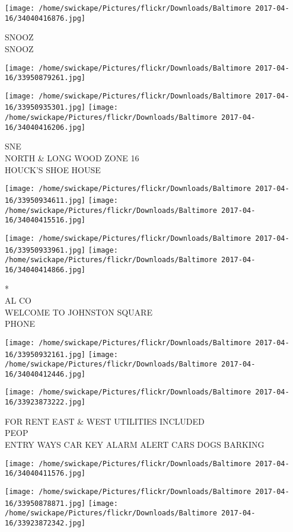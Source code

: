 \documentclass[10pt,letterpaper]{article}
\begin{document}
\vspace{0.25in}
\texttt{[image: /home/swickape/Pictures/flickr/Downloads/Baltimore 2017-04-16/34040416876.jpg]}

SNOOZ\\
SNOOZ
\pagebreak

\texttt{[image: /home/swickape/Pictures/flickr/Downloads/Baltimore 2017-04-16/33950879261.jpg]}

\vspace{0.25in}
\texttt{[image: /home/swickape/Pictures/flickr/Downloads/Baltimore 2017-04-16/33950935301.jpg]}
\texttt{[image: /home/swickape/Pictures/flickr/Downloads/Baltimore 2017-04-16/34040416206.jpg]}

SNE\\
NORTH \& LONG WOOD ZONE 16\\
HOUCK'S SHOE HOUSE
\pagebreak

\texttt{[image: /home/swickape/Pictures/flickr/Downloads/Baltimore 2017-04-16/33950934611.jpg]}
\texttt{[image: /home/swickape/Pictures/flickr/Downloads/Baltimore 2017-04-16/34040415516.jpg]}

\texttt{[image: /home/swickape/Pictures/flickr/Downloads/Baltimore 2017-04-16/33950933961.jpg]}
\texttt{[image: /home/swickape/Pictures/flickr/Downloads/Baltimore 2017-04-16/34040414866.jpg]}

*\\
AL CO\\
WELCOME TO JOHNSTON SQUARE\\
PHONE
\pagebreak

\texttt{[image: /home/swickape/Pictures/flickr/Downloads/Baltimore 2017-04-16/33950932161.jpg]}
\texttt{[image: /home/swickape/Pictures/flickr/Downloads/Baltimore 2017-04-16/34040412446.jpg]}

\texttt{[image: /home/swickape/Pictures/flickr/Downloads/Baltimore 2017-04-16/33923873222.jpg]}

FOR RENT EAST \& WEST UTILITIES INCLUDED\\
PEOP\\
ENTRY WAYS CAR KEY ALARM ALERT CARS DOGS BARKING
\pagebreak

\texttt{[image: /home/swickape/Pictures/flickr/Downloads/Baltimore 2017-04-16/34040411576.jpg]}

\vspace{0.25in}
\texttt{[image: /home/swickape/Pictures/flickr/Downloads/Baltimore 2017-04-16/33950878871.jpg]}
\texttt{[image: /home/swickape/Pictures/flickr/Downloads/Baltimore 2017-04-16/33923872342.jpg]}
\end{document}
